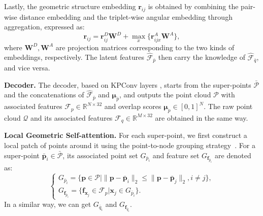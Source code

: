 Lastly, the geometric structure embedding $\bm{r}_{ij}$ is obtained by combining the pair-wise distance embedding and the triplet-wise angular embedding through aggregation, expressed as:
\begin{equation}
\bm{r}_{ij} = \bm{r}^D_{ij}\bm{W}^D+\max_x\{\bm{r}^A_{ijx}\bm{W}^A\},
\end{equation}
where  $\bm{W}^D,\bm{W}^A$ are projection matrices corresponding to the two kinds of embeddings, respectively.
The latent features $\hat{\bm{\mathcal{F}}}_{\bar{p}}$ then carry the knowledge of $\hat{\bm{\mathcal{F}}}_{\bar{q}}$, and vice versa. 

\noindent\textbf{Decoder.} 
The decoder, based on KPConv layers \cite{thomas2019kpconv}, starts from the super-points $\bar{\bm{\mathcal{P}}}$ and the concatenations of $\hat{\bm{\mathcal{F}}}_{\bar{p}}$ and  $\bm{\mu}_{\bar{p}}$, and outputs the point cloud $\bm{\mathcal{P}}$ with associated features $\bm{\mathcal{F}}_{p}\in\mathbb{R}^{N\times 32}$ and overlap scores $\bm{\mu}_{p}\in[0,1]^{N}$. The raw point cloud $\bm{\mathcal{Q}}$ and its associated features $\bm{\mathcal{F}}_{q}\in\mathbb{R}^{M\times 32}$ are obtained in the same way.



\noindent\textbf{Local Geometric Self-attention.}
For each super-point, we first construct a local patch of points around it using the point-to-node grouping strategy~\cite{yu2021cofinet}.
For a super-point $\bar{\bm{p}}_i\in \bar{\bm{\mathcal{P}}}$, its associated point set $G_{\bar{p}_i}$ and feature set $G_{\bm{f}_{\bar{p}_i}}$ are denoted as:
\begin{equation}
    \begin{cases}
		G_{\bar{p}_i}=\{\bm{p}\in \bm{\mathcal{P}}\big|\|\bm{p}-\bm{\bar{p}}_i\|_2\leq\|\bm{p}-\bm{\bar{p}}_j\|_2, i\neq j\}, \\
		G_{\bm{f}_{\bar{p}_i}}=\{\bm{f}_{\bm{x}_j}\in \bm{\mathcal{F}}_{p}\big|\bm{x}_j \in G_{\bar{p}_i}\}.
	\end{cases}
\end{equation}
In a similar way, we can get $G_{\bar{q}_i}$ and $G_{\bm{f}_{\bar{q}_i}}$.

